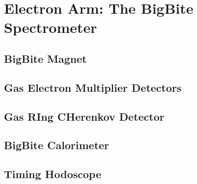 \section{Electron Arm: The BigBite Spectrometer}

\subsection{BigBite Magnet}

\subsection{Gas Electron Multiplier Detectors}

\subsection{Gas RIng CHerenkov Detector}

\subsection{BigBite Calorimeter}

\subsection{Timing Hodoscope}